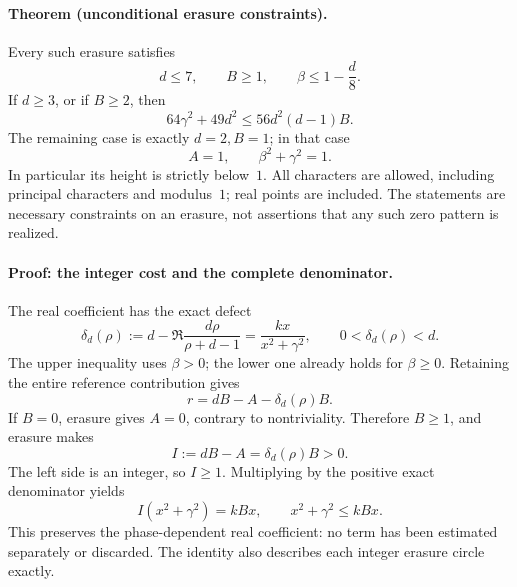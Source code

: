 \paragraph{Theorem (unconditional erasure constraints).}
Every such erasure satisfies
\begin{equation}
 d\le7,\qquad B\ge1,\qquad \beta\le1-\frac d8.
 \label{eq:scalar-erasure-domain}
\end{equation}
If \(d\ge3\), or if \(B\ge2\), then
\begin{equation}
 64\gamma^2+49d^2\le56d^2(d-1)B.
 \label{eq:scalar-erasure-height}
\end{equation}
The remaining case is exactly \(d=2,B=1\); in that case
\begin{equation}
 A=1,\qquad \beta^2+\gamma^2=1.
 \label{eq:scalar-erasure-unit}
\end{equation}
In particular its height is strictly below~\(1\). All characters are
allowed, including principal characters and modulus~\(1\); real points
are included. The statements are necessary constraints on an erasure,
not assertions that any such zero pattern is realized.

\paragraph{Proof: the integer cost and the complete denominator.}
The real coefficient has the exact defect
\begin{equation}
 \delta_d(\rho):=d-\Re\frac{d\rho}{\rho+d-1}
   =\frac{kx}{x^2+\gamma^2},\qquad 0<\delta_d(\rho)<d.
 \label{eq:scalar-erasure-defect}
\end{equation}
The upper inequality uses \(\beta>0\); the lower one already holds for
\(\beta\ge0\). Retaining the entire reference contribution gives
\[
 r=dB-A-\delta_d(\rho)B.
\]
If \(B=0\), erasure gives \(A=0\), contrary to nontriviality. Therefore
\(B\ge1\), and erasure makes
\[
 I:=dB-A=\delta_d(\rho)B>0.
\]
The left side is an integer, so \(I\ge1\). Multiplying by the positive
exact denominator yields
\begin{equation}
 I(x^2+\gamma^2)=kBx,\qquad x^2+\gamma^2\le kBx.
 \label{eq:scalar-erasure-circle}
\end{equation}
This preserves the phase-dependent real coefficient: no term has been
estimated separately or discarded. The identity also describes each
integer erasure circle exactly.

